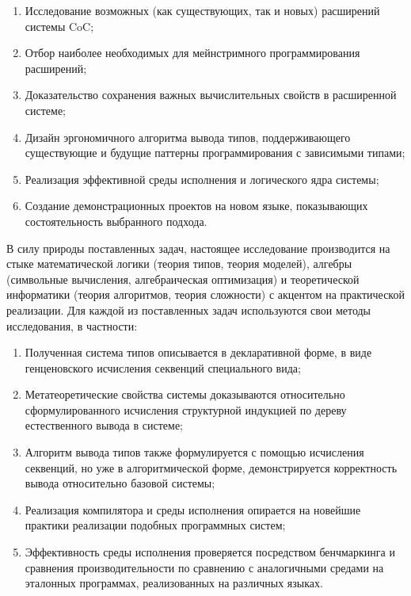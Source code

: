 \begin{enumerate}
    \item Исследование возможных (как существующих, так и
        новых) расширений системы CoC;
    \item Отбор наиболее необходимых для мейнстримного
        программирования расширений;
    \item Доказательство сохранения важных вычислительных
        свойств в расширенной системе;
    \item Дизайн эргономичного алгоритма вывода типов,
        поддерживающего существующие и будущие паттерны
        программирования с зависимыми типами;
    \item Реализация эффективной среды исполнения и
        логического ядра системы;
    \item Создание демонстрационных проектов на новом
        языке, показывающих состоятельность выбранного
        подхода.
\end{enumerate}


В силу природы поставленных задач, настоящее исследование
производится на стыке математической логики (теория типов,
теория моделей), алгебры (символьные вычисления,
алгебраическая оптимизация) и теоретической информатики
(теория алгоритмов, теория сложности) с акцентом на
практической реализации. Для каждой из поставленных задач
используются свои методы исследования, в частности:

\begin{enumerate}
    \item Полученная система типов описывается в
        декларативной форме, в виде генценовского
        исчисления секвенций специального вида;
    \item Метатеоретические свойства системы доказываются
        относительно сформулированного исчисления
        структурной индукцией по дереву естественного
        вывода в системе;
    \item Алгоритм вывода типов также формулируется с
        помощью исчисления секвенций, но уже в
        алгоритмической форме, демонстрируется
        корректность вывода относительно базовой системы;
    \item Реализация компилятора и среды исполнения
        опирается на новейшие практики реализации подобных
        программных систем;
    \item Эффективность среды исполнения проверяется
        посредством бенчмаркинга и сравнения
        производительности по сравнению с аналогичными
        средами на эталонных программах, реализованных на
        различных языках.
\end{enumerate}

